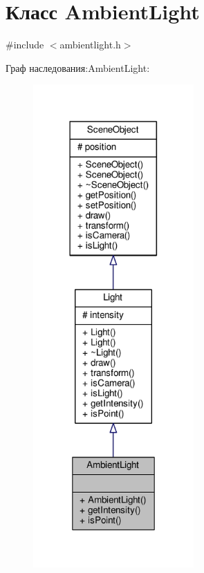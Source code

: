 \hypertarget{class_ambient_light}{}\section{Класс Ambient\+Light}
\label{class_ambient_light}


{\ttfamily \#include $<$ambientlight.\+h$>$}



Граф наследования\+:Ambient\+Light\+:
\nopagebreak
\begin{figure}[H]
\begin{center}
\leavevmode
\includegraphics[width=174pt]{de/dd5/class_ambient_light__inherit__graph}
\end{center}
\end{figure}


